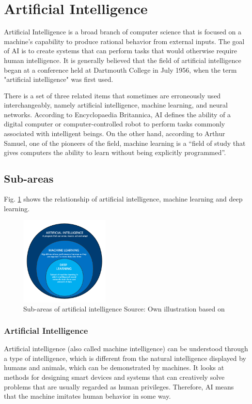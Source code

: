 \section{Artificial Intelligence}
Artificial Intelligence is a broad branch of computer science that is focused on a machine’s capability to produce rational behavior from external inputs. The goal of AI is to create systems that can perform tasks that would otherwise require human intelligence. It is generally believed that the field of artificial intelligence began at a conference held at Dartmouth College in July 1956, when the term "artificial intelligence" was first used\parencite{Brunette2009}.

There is a set of three related items that sometimes are erroneously used interchangeably, namely artificial intelligence, machine learning, and neural networks. According to Encyclopaedia Britannica, AI defines the ability of a digital computer or computer-controlled robot to perform tasks commonly associated with intelligent beings. On the other hand, according to Arthur Samuel, one of the pioneers of the field, machine learning is a “field of study that gives computers the ability to learn without being explicitly programmed”\parencite{Samuel1959, Bhavsar2017}.

\subsection{Sub-areas}
Fig. \ref{fig:ai_taxonomy} shows the relationship of artificial intelligence, machine learning and deep learning.
\begin{figure}[htbp]
\centering
\includegraphics[width=0.4\textwidth]{./images/ai_taxonomy.png}
\caption{Sub-areas of artificial intelligence Source: Own illustration based
on\parencite{Suman2020}}
\label{fig:ai_taxonomy}
\end{figure}

\subsubsection{Artificial Intelligence}
Artificial intelligence (also called machine intelligence) can be understood through a type of intelligence, which is different from the natural intelligence displayed by humans and animals, which can be demonstrated by machines. It looks at methods for designing smart devices and systems that can creatively solve problems that are usually regarded as human privileges. Therefore, AI means that the machine imitates human behavior in some way. 
